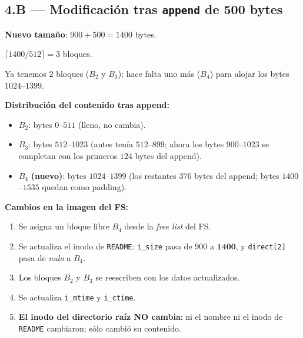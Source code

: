\documentclass[11pt,a4paper]{article}
\begin{document}
\subsection*{4.B --- Modificación tras \texttt{append} de 500 bytes}

\textbf{Nuevo tamaño}: $900 + 500 = 1400$ bytes.

\quad $\lceil 1400 / 512 \rceil = 3$ bloques.

Ya tenemos $2$ bloques ($B_2$ y $B_3$); hace falta uno más
($B_4$) para alojar los bytes $1024$--$1399$.

\textbf{Distribución del contenido tras append:}

\begin{itemize}[leftmargin=*,nosep]
    \item $B_2$: bytes $0$--$511$ (lleno, no cambia).
    \item $B_3$: bytes $512$--$1023$ (antes tenía $512$--$899$;
        ahora los bytes $900$--$1023$ se completan con los primeros
        $124$ bytes del append).
    \item $B_4$ \textbf{(nuevo)}: bytes $1024$--$1399$ (los
        restantes $376$ bytes del append; bytes $1400$--$1535$
        quedan como padding).
\end{itemize}

\textbf{Cambios en la imagen del FS:}

\begin{enumerate}[leftmargin=*,nosep]
    \item Se asigna un bloque libre $B_4$ desde la \emph{free list}
        del FS.
    \item Se actualiza el inodo de \texttt{README}:
        \texttt{i\_size} pasa de $900$ a $\mathbf{1400}$, y
        \texttt{direct[2]} pasa de \emph{nulo} a $B_4$.
    \item Los bloques $B_2$ y $B_3$ se reescriben con los datos
        actualizados.
    \item Se actualiza \texttt{i\_mtime} y \texttt{i\_ctime}.
    \item \textbf{El inodo del directorio raíz NO cambia}: ni el
        nombre ni el inodo de \texttt{README} cambiaron; sólo cambió
        su contenido.
\end{enumerate}
\end{document}
